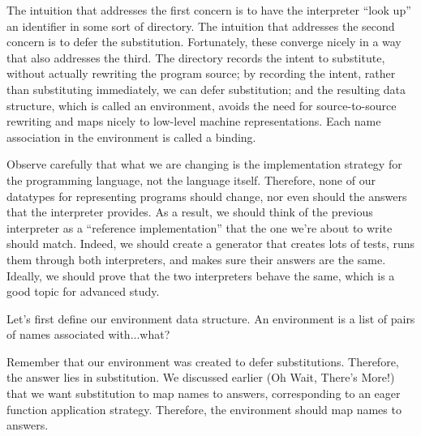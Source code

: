 
The intuition that addresses the first concern is to have the interpreter “look
up” an identifier in some sort of directory. The intuition that addresses the
second concern is to defer the substitution. Fortunately, these converge nicely
in a way that also addresses the third. The directory records the intent to
substitute, without actually rewriting the program source; by recording the
intent, rather than substituting immediately, we can defer substitution; and the
resulting data structure, which is called an environment, avoids the need for
source-to-source rewriting and maps nicely to low-level machine representations.
Each name association in the environment is called a binding.

Observe carefully that what we are changing is the implementation strategy for
the programming language, not the language itself. Therefore, none of our
datatypes for representing programs should change, nor even should the answers
that the interpreter provides. As a result, we should think of the previous
interpreter as a “reference implementation” that the one we’re about to write
should match. Indeed, we should create a generator that creates lots of tests,
runs them through both interpreters, and makes sure their answers are the same.
Ideally, we should prove that the two interpreters behave the same, which is a
good topic for advanced study.

Let’s first define our environment data structure. An environment is a list of
pairs of names associated with...what?


Remember that our environment was created to defer substitutions. Therefore, the
answer lies in substitution. We discussed earlier (Oh Wait, There’s More!) that
we want substitution to map names to answers, corresponding to an eager function
application strategy. Therefore, the environment should map names to answers.
